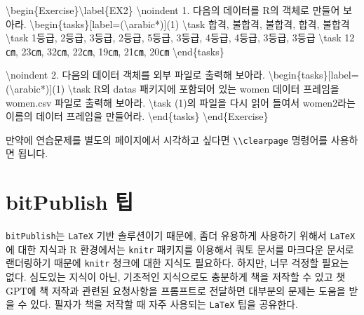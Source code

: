 \documentclass[
  letterpaper,
]{book}
\newenvironment{Shaded}{\begin{snugshade}}{\end{snugshade}}
\newcommand{\ExtensionTok}[1]{\textcolor[rgb]{0.00,0.23,0.31}{#1}}
\newcommand{\FunctionTok}[1]{\textcolor[rgb]{0.28,0.35,0.67}{#1}}
\newcommand{\KeywordTok}[1]{\textcolor[rgb]{0.00,0.23,0.31}{#1}}
\newcommand{\NormalTok}[1]{\textcolor[rgb]{0.00,0.23,0.31}{#1}}
\begin{document}
\begin{Shaded}
\begin{Highlighting}[]
\KeywordTok{\textbackslash{}begin}\NormalTok{\{}\ExtensionTok{Exercise}\NormalTok{\}}\KeywordTok{\textbackslash{}label}\NormalTok{\{}\ExtensionTok{EX2}\NormalTok{\}}
\FunctionTok{\textbackslash{}noindent}\NormalTok{ 1. 다음의 데이터를 R의 객체로 만들어 보아라.}
\KeywordTok{\textbackslash{}begin}\NormalTok{\{}\ExtensionTok{tasks}\NormalTok{\}[label=(}\FunctionTok{\textbackslash{}arabic*}\NormalTok{)](1)}
 \FunctionTok{\textbackslash{}task}\NormalTok{ 합격, 불합격, 불합격, 합격, 불합격}
 \FunctionTok{\textbackslash{}task}\NormalTok{ 1등급, 2등급, 3등급, 2등급, 5등급, 3등급, 4등급, 4등급, 3등급, 3등급}
 \FunctionTok{\textbackslash{}task}\NormalTok{ 12㎝, 23㎝, 32㎝, 22㎝, 19㎝, 21㎝, 20㎝}
\KeywordTok{\textbackslash{}end}\NormalTok{\{}\ExtensionTok{tasks}\NormalTok{\}}

\FunctionTok{\textbackslash{}noindent}\NormalTok{ 2. 다음의 데이터 객체를 외부 파일로 출력해 보아라.}
\KeywordTok{\textbackslash{}begin}\NormalTok{\{}\ExtensionTok{tasks}\NormalTok{\}[label=(}\FunctionTok{\textbackslash{}arabic*}\NormalTok{)](1)}
 \FunctionTok{\textbackslash{}task}\NormalTok{ R의 datas 패키지에 포함되어 있는 women 데이터 프레임을 women.csv 파일로 출력해 보아라.}
 \FunctionTok{\textbackslash{}task}\NormalTok{ (1)의 파일을 다시 읽어 들여서 women2라는 이름의 데이터 프레임을 만들어라.}
\KeywordTok{\textbackslash{}end}\NormalTok{\{}\ExtensionTok{tasks}\NormalTok{\}}
\KeywordTok{\textbackslash{}end}\NormalTok{\{}\ExtensionTok{Exercise}\NormalTok{\}}
\end{Highlighting}
\end{Shaded}

만약에 연습문제를 별도의 페이지에서 시각하고 싶다면
\texttt{\textbackslash{}\textbackslash{}clearpage} 명령어를 사용하면
됩니다.

\hypertarget{bitpublish-uxd301}{%
\section{bitPublish 팁}\label{bitpublish-uxd301}}

\texttt{bitPublish}는 \texttt{LaTeX} 기반 솔루션이기 때문에, 좀더
유용하게 사용하기 위해서 \texttt{LaTeX}에 대한 지식과 R 환경에서는
\texttt{knitr} 패키지를 이용해서 쿼토 문서를 마크다운 문서로 랜더링하기
때문에 \texttt{knitr} 청크에 대한 지식도 필요하다. 하지만, 너무 걱정할
필요는 없다. 심도있는 지식이 아닌, 기초적인 지식으로도 충분하게 책을
저작할 수 있고 챗GPT에 책 저작과 관련된 요청사항을 프롬프트로 전달하면
대부분의 문제는 도움을 받을 수 있다. 필자가 책을 저작할 때 자주 사용되는
\texttt{LaTeX} 팁을 공유한다.
\end{document}
